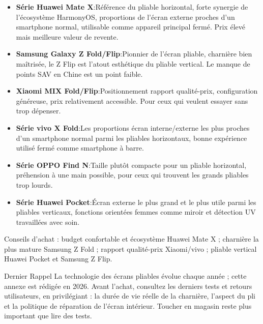 \begin{itemize}
  \item \textbf{Série Huawei Mate X}:Référence du pliable horizontal, forte synergie de l'écosystème HarmonyOS, proportions de l'écran externe proches d'un smartphone normal, utilisable comme appareil principal fermé. Prix élevé mais meilleure valeur de revente.
  \item \textbf{Samsung Galaxy Z Fold/Flip}:Pionnier de l'écran pliable, charnière bien maîtrisée, le Z Flip est l'atout esthétique du pliable vertical. Le manque de points SAV en Chine est un point faible.
  \item \textbf{Xiaomi MIX Fold/Flip}:Positionnement rapport qualité-prix, configuration généreuse, prix relativement accessible. Pour ceux qui veulent essayer sans trop dépenser.
  \item \textbf{Série vivo X Fold}:Les proportions écran interne/externe les plus proches d'un smartphone normal parmi les pliables horizontaux, bonne expérience utilisé fermé comme smartphone à barre.
  \item \textbf{Série OPPO Find N}:Taille plutôt compacte pour un pliable horizontal, préhension à une main possible, pour ceux qui trouvent les grands pliables trop lourds.
  \item \textbf{Série Huawei Pocket}:Écran externe le plus grand et le plus utile parmi les pliables verticaux, fonctions orientées femmes comme miroir et détection UV travaillées avec soin.
\end{itemize}

Conseils d'achat : budget confortable et écosystème Huawei Mate X ; charnière la plus mature Samsung Z Fold ; rapport qualité-prix Xiaomi/vivo ; pliable vertical Huawei Pocket et Samsung Z Flip.

\begin{tcbinfo}{Dernier Rappel}
La technologie des écrans pliables évolue chaque année ; cette annexe est rédigée en 2026. Avant l'achat, consultez les derniers tests et retours utilisateurs, en privilégiant : la durée de vie réelle de la charnière, l'aspect du pli et la politique de réparation de l'écran intérieur. Toucher en magasin reste plus important que lire des tests.

\end{tcbinfo}
